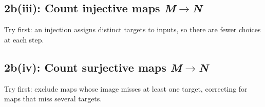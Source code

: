 \documentclass[11pt]{article}
\begin{document}
\begin{keepsection}
\begin{keepsection}
\end{keepsection}

\begin{keepsection}
\subsection{2b(iii): Count injective maps \textit{M}\ensuremath{\to}\textit{N}}

Try first: an injection assigns distinct targets to inputs, so there are fewer choices at each step.

\end{keepsection}

\begin{keepsection}
\subsection{2b(iv): Count surjective maps \textit{M}\ensuremath{\to}\textit{N}}

Try first: exclude maps whose image misses at least one target, correcting for maps that miss several targets.

\end{keepsection}
\end{keepsection}
\end{document}
